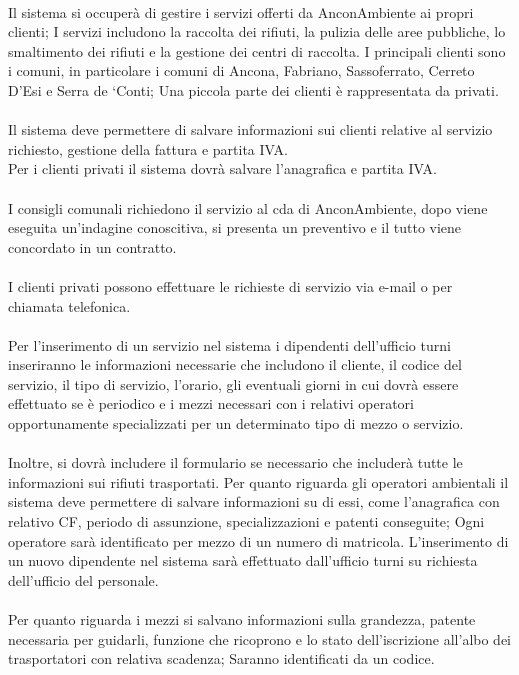 \documentclass[green, fancy, 11pt]{elegantbook}
\begin{document}
\\
Il sistema si occuperà di gestire i servizi offerti da AnconAmbiente ai propri clienti; I servizi includono la raccolta dei rifiuti, la pulizia delle aree pubbliche, lo smaltimento dei rifiuti e la gestione dei centri di raccolta.
I principali clienti sono i comuni, in particolare i comuni di Ancona, Fabriano, Sassoferrato, Cerreto D’Esi e Serra de ‘Conti; Una piccola parte dei clienti è rappresentata da privati.\\
\\
Il sistema deve permettere di salvare informazioni sui clienti relative al servizio richiesto, gestione della fattura e partita IVA.\\
Per i clienti privati il sistema dovrà salvare l’anagrafica e partita IVA.\\
\\
I consigli comunali richiedono il servizio al cda di AnconAmbiente, dopo viene eseguita un’indagine conoscitiva, si presenta un preventivo e il tutto viene concordato in un contratto.\\
\\
I clienti privati possono effettuare le richieste di servizio via e-mail o per chiamata telefonica.\\
\\
Per l’inserimento di un servizio nel sistema i dipendenti dell’ufficio turni inseriranno le informazioni necessarie che includono il cliente, il codice del servizio, il tipo di servizio, l’orario, gli eventuali giorni in cui dovrà essere effettuato se è periodico e i mezzi necessari con i relativi operatori opportunamente specializzati per un determinato tipo di mezzo o servizio.\\
\\
Inoltre, si dovrà includere il formulario se necessario che includerà tutte le informazioni sui rifiuti trasportati.
Per quanto riguarda gli operatori ambientali il sistema deve permettere di salvare informazioni su di essi, come l’anagrafica con relativo CF, periodo di assunzione, specializzazioni e patenti conseguite; Ogni operatore sarà identificato per mezzo di un numero di matricola.
L’inserimento di un nuovo dipendente nel sistema sarà effettuato dall’ufficio turni su richiesta dell’ufficio del personale.\\
\\
Per quanto riguarda i mezzi si salvano informazioni sulla grandezza, patente necessaria per guidarli, funzione che ricoprono e lo stato dell’iscrizione all’albo dei trasportatori con relativa scadenza; Saranno identificati da un codice.\\
\end{document}

